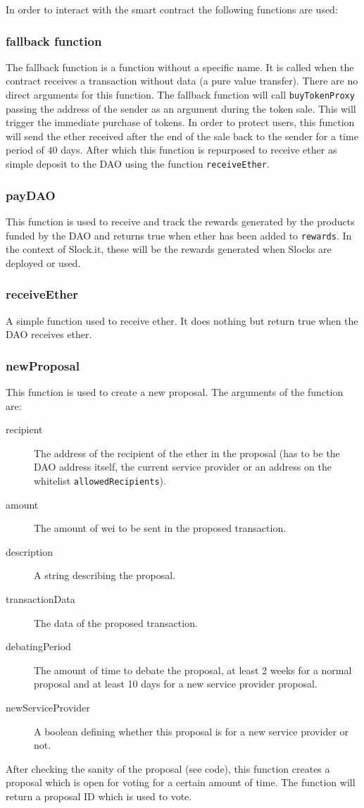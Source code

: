 \documentclass[9pt,oneside]{amsart}
\begin{document}
\begin{multicols}{2}
In order to interact with the smart contract the following functions are used:

\subsubsection*{fallback function}
The fallback function is a function without a specific name. It is called when the contract receives a transaction without data (a pure value transfer). There are no direct arguments for this function.
The fallback function will call \verb|buyTokenProxy| passing the address of the sender as an argument during the token sale. This will trigger the immediate purchase of tokens. In order to protect users, this function will send the ether received after the end of the sale back to the sender for a time period of $40$ days. After which this function is repurposed to receive ether as simple deposit to the DAO using the function \verb|receiveEther|.

\subsubsection*{payDAO}
This function is used to receive and track the rewards generated by the products funded by the DAO and returns true when ether has been added to \verb|rewards|. In the context of Slock.it, these will be the rewards generated when Slocks are deployed or used.

\subsubsection*{receiveEther}
A simple function used to receive ether. It does nothing but return true when the DAO receives ether.

\subsubsection*{newProposal}
This function is used to create a new proposal. The arguments of the function are:
\begin{description}
 \item[recipient] The address of the recipient of the ether in the proposal (has to be the DAO address itself, the current service provider or an address on the whitelist \verb|allowedRecipients|).
 \item[amount] The amount of wei to be sent in the proposed transaction.
 \item[description] A string describing the proposal.
 \item[transactionData] The data of the proposed transaction.
 \item[debatingPeriod] The amount of time to debate the proposal, at least 2 weeks for a normal proposal and at least 10 days for a new service provider proposal.
 \item[newServiceProvider] A boolean defining whether this proposal is for a new service provider or not.
\end{description}
After checking the sanity of the proposal (see code), this function creates a proposal which is open for voting for a certain amount of time. The function will return a proposal ID which is used to vote.


\end{multicols}
\end{document}
